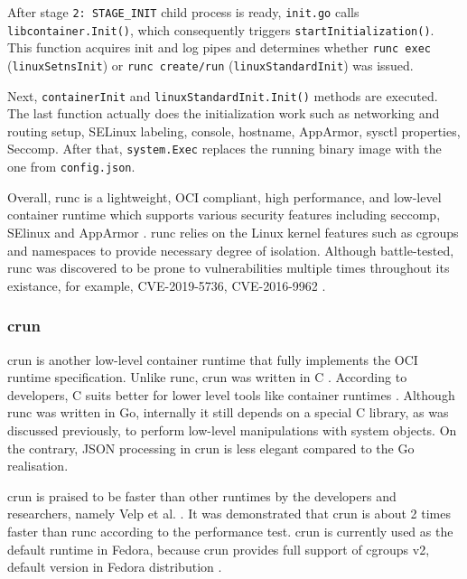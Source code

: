 After stage \texttt{2: STAGE\_INIT} child process is ready, \texttt{init.go} calls \texttt{libcontainer.Init()}, which consequently triggers \texttt{startInitialization()}. This function acquires init and log pipes and determines whether \texttt{runc exec} (\texttt{linuxSetnsInit}) or \texttt{runc create/run} (\texttt{linuxStandardInit}) was issued.

Next, \texttt{containerInit} and \texttt{linuxStandardInit.Init()} methods are executed. The last function actually does the initialization work such as networking and routing setup, SELinux labeling, console, hostname, AppArmor, sysctl properties, Seccomp. After that, \texttt{system.Exec} replaces the running binary image with the one from \texttt{config.json}.

Overall, runc is a lightweight, OCI compliant, high performance, and low-level container runtime which supports various security features including seccomp, SElinux and AppArmor \cite{c:5}. runc relies on the Linux kernel features such as cgroups and namespaces to provide necessary degree of isolation. Although battle-tested, runc was discovered to be prone to vulnerabilities multiple times throughout its existance, for example, CVE-2019-5736, CVE-2016-9962 \cite{s:unit42} \cite{s:rh1}.

\subsubsection*{crun}

crun is another low-level container runtime that fully implements the OCI runtime specification. Unlike runc, crun was written in C \cite{d:implementations}. According to developers, C suits better for lower level tools like container runtimes \cite{gh:crun}. Although runc was written in Go, internally it still depends on a special C library, as was discussed previously, to perform low-level manipulations with system objects. On the contrary, JSON processing in crun is less elegant compared to the Go realisation.

crun is praised to be faster than other runtimes by the developers and researchers, namely Velp et al. \cite{c:6}. It was demonstrated that crun is about 2 times faster than runc according to the performance test. crun is currently used as the default runtime in Fedora, because crun provides full support of cgroups v2, default version in Fedora distribution \cite{c:7}.

